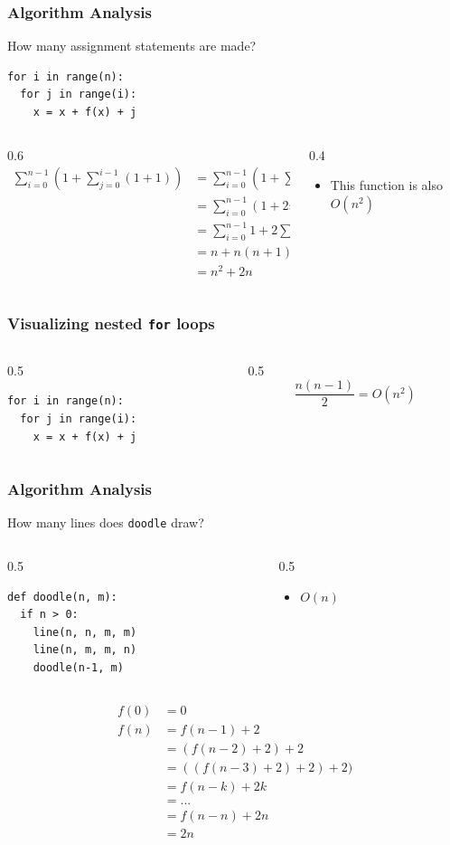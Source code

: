 \documentclass{beamer}
\newcommand{\bi}{\begin{itemize}}
\newcommand{\li}{\item}
\newcommand{\ei}{\end{itemize}}
\newcommand{\bfr}[1]{\begin{frame}[fragile]\frametitle{{ #1 }}}
\newcommand{\cola}{\begin{columns}\begin{column}{0.5\textwidth}}
\newcommand{\colb}{\end{column}\begin{column}{0.5\textwidth}}
\newcommand{\colc}{\end{column}\end{columns}}
\begin{document}
\bfr{Algorithm Analysis}
How many assignment statements are made?
\begin{lstlisting}
for i in range(n):
  for j in range(i):
    x = x + f(x) + j
\end{lstlisting}
\pause
\begin{columns}
\begin{column}{0.6\textwidth}
\begin{align*}
\sum_{i=0}^{n-1}\left(1 + \sum_{j=0}^{i-1}(1+1)\right)
&= 
\sum_{i=0}^{n-1}\left(1 + \sum_{j=0}^{i-1}2\right)\\
&=
\sum_{i=0}^{n-1}(1 + 2i)\\
&=
\sum_{i=0}^{n-1}1 + 2\sum_{i=0}^{n-1}i\\
&= n + n(n+1)\\
&= n^2 + 2n
\end{align*}
\end{column}
\begin{column}{0.4\textwidth}
\bi
\li This function is also $O(n^2)$
\ei
\end{column}
\end{columns}
\end{frame}

\bfr{Visualizing nested {\tt for} loops}
\cola
\begin{lstlisting}
for i in range(n):
  for j in range(i):
    x = x + f(x) + j
\end{lstlisting}
\colb
\[\frac{n(n-1)}{2}=O(n^2)\]
\colc

\begin{center}
\end{center}

\end{frame}
\bfr{Algorithm Analysis}
How many lines does {\tt doodle} draw?
\cola
\begin{lstlisting}
def doodle(n, m):
  if n > 0:
    line(n, n, m, m)
    line(n, m, m, n)
    doodle(n-1, m)
\end{lstlisting}
\pause
\colb
\bi\li $O(n)$ \ei
\colc
\begin{align*}
f(0) &= 0\\
f(n) &= f(n-1) + 2\\
  &= (f(n-2) + 2) + 2\\
  &= ((f(n-3) + 2) + 2) + 2)\\
  &= f(n-k) + 2k \\
  &= ...\\
  &= f(n-n) + 2n\\
  &= 2n
\end{align*}
\end{frame}
\end{document}
